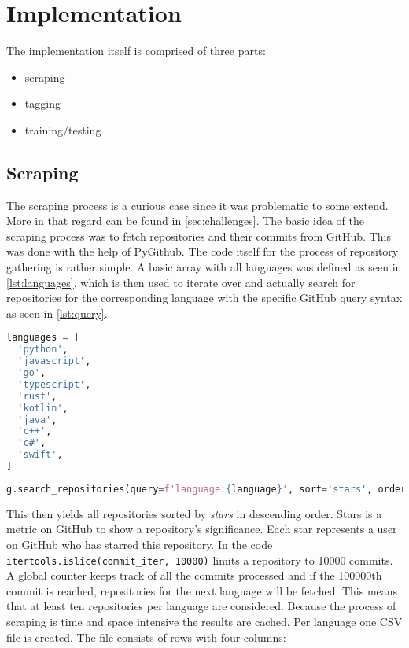 \section{Implementation}
\label{sec:implementation}

The implementation itself is comprised of three parts:

\begin{itemize}
  \item scraping
  \item tagging
  \item training/testing
\end{itemize}

\subsection{Scraping}

The scraping process is a curious case since it was problematic to some extend.
More in that regard can be found in \autoref{sec:challenges}. The basic idea
of the scraping process was to fetch repositories and their commits from
GitHub. This was done with the help of PyGithub. The code itself for the
process of repository gathering is rather simple. A basic array with all
languages was defined as seen in \autoref{lst:languages}, which is then used to
iterate over and actually search for repositories for the corresponding language
with the specific GitHub query syntax as seen in \autoref{lst:query}.

\begin{lstlisting}[language=python, label={lst:languages}, caption={Array of all languages for scraping}]
languages = [
  'python',
  'javascript',
  'go',
  'typescript',
  'rust',
  'kotlin',
  'java',
  'c++',
  'c#',
  'swift',
]
\end{lstlisting}

\begin{lstlisting}[language=python, label={lst:query}, caption={GitHub query syntax}]
g.search_repositories(query=f'language:{language}', sort='stars', order='desc'):
\end{lstlisting}

This then yields all repositories sorted by \textit{stars} in descending order.
Stars is a metric on GitHub to show a repository's significance. Each star represents
a user on GitHub who has starred this repository. In the code
\lstinline{itertools.islice(commit_iter, 10000)} limits a repository to 10000
commits. A global counter keeps track of all the commits processed and if the
100000th commit is reached, repositories for the next language will be fetched.
This means that at least ten repositories per language are considered. Because
the process of scraping is time and space intensive the results are cached. Per
language one CSV file is created. The file consists of rows with four columns:

